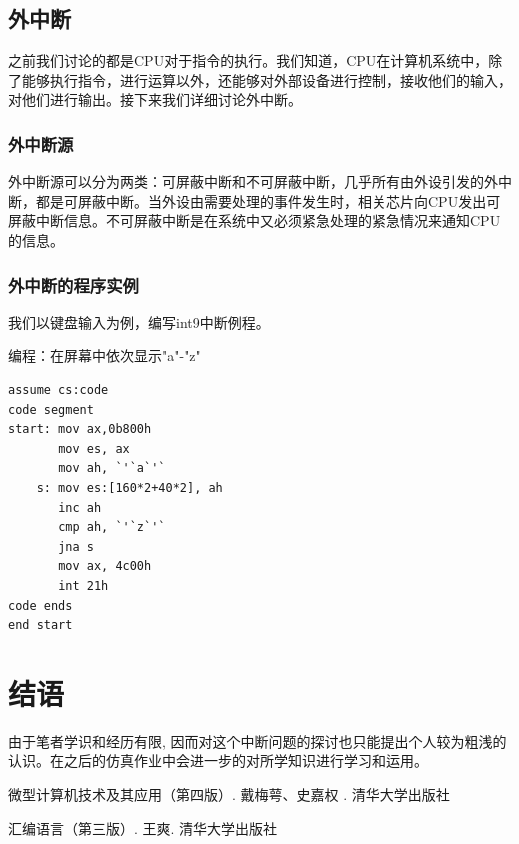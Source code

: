 \documentclass[UTF8]{ctexart}
\begin{document}
\subsection{外中断}
之前我们讨论的都是CPU对于指令的执行。我们知道，CPU在计算机系统中，除了能够执行指令，进行运算以外，还能够对外部设备进行控制，接收他们的输入，对他们进行输出。接下来我们详细讨论外中断。
\subsubsection{外中断源}
外中断源可以分为两类：可屏蔽中断和不可屏蔽中断，几乎所有由外设引发的外中断，都是可屏蔽中断。当外设由需要处理的事件发生时，相关芯片向CPU发出可屏蔽中断信息。不可屏蔽中断是在系统中又必须紧急处理的紧急情况来通知CPU的信息。
\subsubsection{外中断的程序实例}
我们以键盘输入为例，编写int9中断例程。\par
编程：在屏幕中依次显示"a"-"z"\par
\begin{lstlisting}
assume cs:code
code segment
start: mov ax,0b800h
       mov es, ax
       mov ah, `'`a`'`
    s: mov es:[160*2+40*2], ah
       inc ah
       cmp ah, `'`z`'`
       jna s
       mov ax, 4c00h
       int 21h
code ends
end start
\end{lstlisting}
\section{结语}
由于笔者学识和经历有限, 因而对这个中断问题的探讨也只能提出个人较为粗浅的认识。在之后的仿真作业中会进一步的对所学知识进行学习和运用。
\begin{thebibliography}{1}

微型计算机技术及其应用（第四版）. 戴梅萼、史嘉权 . 清华大学出版社

汇编语言（第三版）. 王爽. 清华大学出版社


\end{thebibliography}
\end{document}
